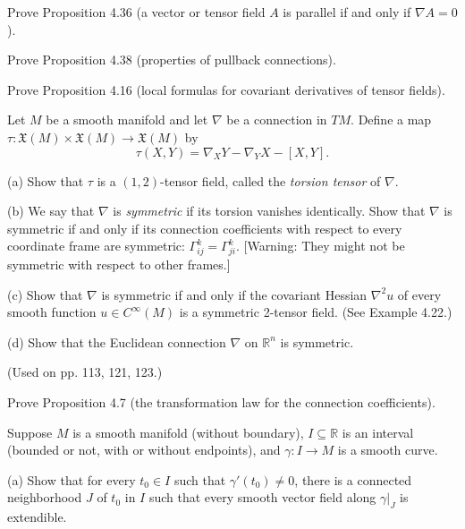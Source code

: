 \begin{exercise}
\label{prob:parallel-tensor-fields}
Prove Proposition 4.36 (a vector or tensor field $A$ is parallel if and only if $\nabla A = 0$).
\end{exercise}

\begin{exercise}
\label{prob:pullback-connections}
Prove Proposition 4.38 (properties of pullback connections).
\end{exercise}

\begin{exercise}\label{prob:tensor-field-formulas}
Prove Proposition 4.16 (local formulas for covariant derivatives of tensor fields).
\end{exercise}

\begin{exercise}\label{prob:torsion-tensor}

Let $M$ be a smooth manifold and let $\nabla$ be a connection in $TM$. Define a map $\tau: \mathfrak{X}(M) \times \mathfrak{X}(M) \to \mathfrak{X}(M)$ by
\[
\tau(X,Y) = \nabla_X Y - \nabla_Y X - [X,Y].
\]

(a) Show that $\tau$ is a $(1,2)$-tensor field, called the \textit{torsion tensor} of $\nabla$.

(b) We say that $\nabla$ is \textit{symmetric} if its torsion vanishes identically. Show that $\nabla$ is symmetric if and only if its connection coefficients with respect to every coordinate frame are symmetric: $\Gamma^k_{ij} = \Gamma^k_{ji}$. [Warning: They might not be symmetric with respect to other frames.]

(c) Show that $\nabla$ is symmetric if and only if the covariant Hessian $\nabla^2 u$ of every smooth function $u \in C^\infty(M)$ is a symmetric 2-tensor field. (See Example 4.22.)

(d) Show that the Euclidean connection $\nabla$ on $\mathbb{R}^n$ is symmetric.

(Used on pp. 113, 121, 123.)
\end{exercise}

\begin{exercise}\label{prob:transformation-law-connection}


Prove Proposition 4.7 (the transformation law for the connection coefficients).
\end{exercise}

\begin{exercise}\label{prob:vector-field-extendibility}
Suppose $M$ is a smooth manifold (without boundary), $I \subseteq \mathbb{R}$ is an interval (bounded or not, with or without endpoints), and $\gamma: I \to M$ is a smooth curve.

(a) Show that for every $t_0 \in I$ such that $\gamma'(t_0) \neq 0$, there is a connected neighborhood $J$ of $t_0$ in $I$ such that every smooth vector field along $\gamma|_J$ is extendible.
\end{exercise}
